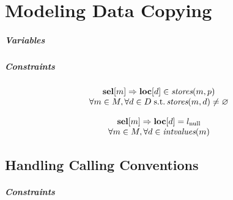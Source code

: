 %

\chapter{Modeling Data Copying}

\paragraph{Variables}

\paragraph{Constraints}

\begin{equation}
  \begin{array}{c}
    \mVar{sel}[m]
    \mImp
    \mVar{loc}[d] \in \mStores(m, p) \\
    \forall m \in \mMatchSet,
    \forall d \in \mDataSet \;\text{s.t.} \mStores(m, d) \neq \mEmptySet
  \end{array}
  \labelEquation{valid-locations}
\end{equation}

\begin{equation}
  \begin{array}{c}
    \mVar{sel}[m]
    \mImp
    \mVar{loc}[d] = \mNullLocation \\
    \forall m \in \mMatchSet,
    \forall d \in \mIntValues(m)
  \end{array}
  \labelEquation{locs-of-intermediate-values}
\end{equation}



\section{Handling Calling Conventions}

\paragraph{Constraints}
